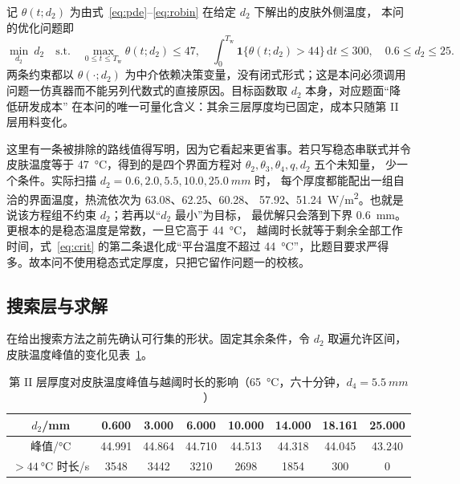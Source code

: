 \documentclass[withoutpreface,bwprint]{cumcmthesis}
\begin{document}
记 $\theta(t;d_2)$ 为由式~\eqref{eq:pde}--\eqref{eq:robin} 在给定 $d_2$ 下解出的皮肤外侧温度，
本问的优化问题即
\begin{equation}
  \min_{d_2}\ d_2
  \quad \text{s.t.}\quad
  \max_{0\le t\le T_{\mathrm{w}}}\theta(t;d_2)\le 47,\quad
  \int_{0}^{T_{\mathrm{w}}}\mathbf{1}\{\theta(t;d_2)>44\}\,\mathrm{d}t \le 300,\quad
  0.6\le d_2\le 25 .
  \label{eq:opt2}
\end{equation}
两条约束都以 $\theta(\cdot;d_2)$ 为中介依赖决策变量，没有闭式形式；这是本问必须调用
问题一仿真器而不能另列代数式的直接原因。目标函数取 $d_2$ 本身，对应题面“降低研发成本”
在本问的唯一可量化含义：其余三层厚度均已固定，成本只随第 II 层用料变化。

这里有一条被排除的路线值得写明，因为它看起来更省事。若只写稳态串联式并令皮肤温度等于
\SI{47}{\celsius}，得到的是四个界面方程对 $\theta_2,\theta_3,\theta_4,q,d_2$ 五个未知量，
少一个条件。实际扫描 $d_2=\num{0.6},\num{2.0},\num{5.5},\num{10.0},\SI{25.0}{mm}$ 时，
每个厚度都能配出一组自洽的界面温度，热流依次为 \num{63.08}、\num{62.25}、\num{60.28}、
\num{57.92}、\SI{51.24}{W/m^2}。也就是说该方程组不约束 $d_2$；若再以“$d_2$ 最小”为目标，
最优解只会落到下界 \SI{0.6}{mm}。更根本的是稳态温度是常数，一旦它高于 \SI{44}{\celsius}，
越阈时长就等于剩余全部工作时间，式~\eqref{eq:crit} 的第二条退化成“平台温度不超过
\SI{44}{\celsius}”，比题目要求严得多。故本问不使用稳态式定厚度，只把它留作问题一的校核。

\subsection{搜索层与求解}

在给出搜索方法之前先确认可行集的形状。固定其余条件，令 $d_2$ 取遍允许区间，
皮肤温度峰值的变化见表~\ref{tab:mono}。

\begin{table}[htbp]
  \centering
  \caption{第 II 层厚度对皮肤温度峰值与越阈时长的影响（\SI{65}{\celsius}，六十分钟，$d_4=\SI{5.5}{mm}$）}
  \label{tab:mono}
  \begin{tabular}{cccccccc}
    \toprule
    $d_2$/\si{mm} & 0.600 & 3.000 & 6.000 & 10.000 & 14.000 & 18.161 & 25.000 \\
    \midrule
    峰值/\si{\celsius} & 44.991 & 44.864 & 44.710 & 44.513 & 44.318 & 44.045 & 43.240 \\
    $>\SI{44}{\celsius}$ 时长/\si{s} & 3548 & 3442 & 3210 & 2698 & 1854 & 300 & 0 \\
    \bottomrule
  \end{tabular}
\end{table}
\end{document}

